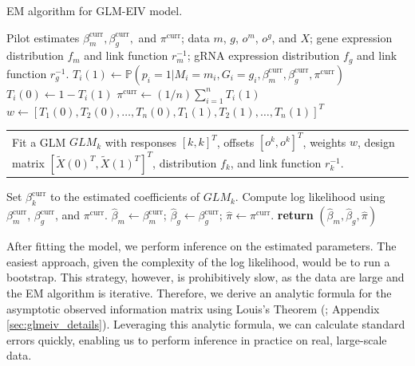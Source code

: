 \documentclass[12pt]{article}
\makeatletter
\newcommand{\multiline}[1]{%
	\begin{tabularx}{\dimexpr\linewidth-\ALG@thistlm}[t]{@{}X@{}}
		#1
	\end{tabularx}
}
\makeatother
\begin{document}
\begin{algorithm}
	\caption{EM algorithm for GLM-EIV model.}\label{algo:em_full}
	\begin{algorithmic}
		\Require Pilot estimates $\beta^\textrm{curr}_m, \beta^\textrm{curr}_g,$ and $\pi^\textrm{curr}$; data $m$, $g$, $o^m$, $o^g$, and $X$; gene expression distribution $f_m$ and link function $r^{-1}_m$; gRNA expression distribution $f_g$ and link function $r^{-1}_g$.  
		 
		\State $T_i(1) \gets \mathbb{P}\left(p_i = 1 |M_i = m_i, G_i = g_i, \beta_m^\textrm{curr}, \beta_g^\textrm{curr}, \pi^\textrm{curr} \right)$
		\State $T_i(0) \gets 1 - T_i(1)$
		\EndFor
		\State $\pi^{\textrm{curr}} \gets (1/n) \sum_{i=1}^n T_i(1)$ 
		\State $w \gets [T_1(0), T_2(0), \dots, T_n(0), T_1(1), T_2(1), \dots, T_n(1)]^T$
		\State  \multiline{ 
			Fit a GLM $GLM_k$ with responses $[k,k]^T$, offsets $[o^k, o^k]^T$, weights $w$, design matrix $[\tilde{X}(0)^T, \tilde{X}(1)^T]^T$, distribution $f_k$, and link function $r^{-1}_k$.
		}
		\State Set $\beta_k^\textrm{curr}$ to the estimated coefficients of $GLM_k$.
		\EndFor
		\State Compute log likelihood using $\beta_m^\textrm{curr}$, $\beta_g^\textrm{curr}$, and $\pi^\textrm{curr}$.
		\EndWhile
		\State $\hat{\beta}_m \gets \beta_m^\textrm{curr}$; $\hat{\beta}_g \gets \beta_g^\textrm{curr}$; $\hat{\pi} \gets \pi^\textrm{curr}$.
		\State \textbf{return} $(\hat{\beta}_m, \hat{\beta}_g, \hat{\pi})$
	\end{algorithmic}
\end{algorithm}

After fitting the model, we perform inference on the estimated parameters. The easiest approach, given the complexity of the log likelihood, would be to run a bootstrap. This strategy, however, is prohibitively slow, as the data are large and the EM algorithm is iterative. Therefore, we derive an analytic formula for the asymptotic observed information matrix using Louis's Theorem (\cite{Louis1982}; Appendix \ref{sec:glmeiv_details}). Leveraging this analytic formula, we can calculate standard errors quickly, enabling us to perform inference in practice on real, large-scale data.
\end{document}
